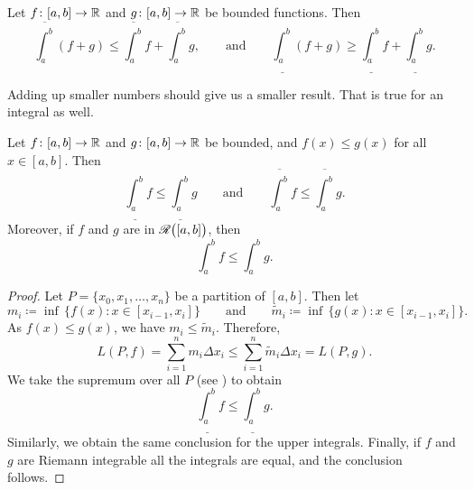 \begin{prop} \label{prop:upperlowerlinineq}
Let $f \colon [a,b] \to {\mathbb{R}}$ and $g \colon [a,b] \to {\mathbb{R}}$ be bounded
functions.  Then
\begin{equation*}
\overline{\int_a^b} (f+g) \leq \overline{\int_a^b}f+\overline{\int_a^b}g
,
\qquad
\text{and}
\qquad
\underline{\int_a^b} (f+g) \geq \underline{\int_a^b}f+\underline{\int_a^b}g
.
\end{equation*}
\end{prop}

Adding up smaller numbers should give us a smaller result.
That is true for an integral as well.

\begin{prop}[Monotonicity]
Let $f \colon [a,b] \to {\mathbb{R}}$ and $g \colon [a,b] \to {\mathbb{R}}$ be
bounded, and $f(x) \leq g(x)$
for all $x \in [a,b]$.  Then
\begin{equation*}
\underline{\int_a^b} f 
\leq
\underline{\int_a^b} g 
\qquad \text{and} \qquad
\overline{\int_a^b} f 
\leq
\overline{\int_a^b} g .
\end{equation*}
Moreover, if $f$ and $g$ are in ${\mathscr{R}}\bigl([a,b]\bigr)$, then
\begin{equation*}
\int_a^b f 
\leq
\int_a^b g .
\end{equation*}
\end{prop}

\begin{proof}
Let $P = \{ x_0, x_1, \ldots, x_n \}$ be a partition of $[a,b]$.  Then
let
\begin{equation*}
m_i \coloneqq \inf \, \bigl\{ f(x) : x \in [x_{i-1},x_i] \bigr\}
\qquad \text{and} \qquad
\widetilde{m}_i \coloneqq \inf \, \bigl\{ g(x) : x \in [x_{i-1},x_i] \bigr\} .
\end{equation*}
As $f(x) \leq g(x)$, we have $m_i \leq \widetilde{m}_i$.
Therefore,
\begin{equation*}
L(P,f)
=
\sum_{i=1}^n m_i \Delta x_i
\leq
\sum_{i=1}^n \widetilde{m}_i \Delta x_i
=
L(P,g) .
\end{equation*}
We take the supremum over all $P$ (see ) to obtain 
\begin{equation*}
\underline{\int_a^b} f 
\leq
\underline{\int_a^b} g .
\end{equation*}
Similarly, we obtain the same conclusion for the upper integrals.
Finally,
if $f$ and $g$ are Riemann integrable all the integrals are equal,
and the conclusion follows.
\end{proof}

